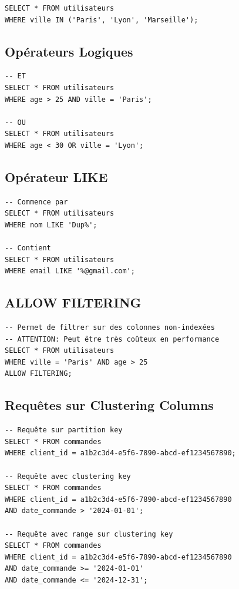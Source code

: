 \documentclass[11pt,a4paper]{article}
\begin{document}
\begin{lstlisting}
SELECT * FROM utilisateurs
WHERE ville IN ('Paris', 'Lyon', 'Marseille');
\end{lstlisting}

\subsection{Opérateurs Logiques}

\begin{lstlisting}
-- ET
SELECT * FROM utilisateurs
WHERE age > 25 AND ville = 'Paris';

-- OU
SELECT * FROM utilisateurs
WHERE age < 30 OR ville = 'Lyon';
\end{lstlisting}

\subsection{Opérateur LIKE}

\begin{lstlisting}
-- Commence par
SELECT * FROM utilisateurs
WHERE nom LIKE 'Dup%';

-- Contient
SELECT * FROM utilisateurs
WHERE email LIKE '%@gmail.com';
\end{lstlisting}

\subsection{ALLOW FILTERING}

\begin{lstlisting}
-- Permet de filtrer sur des colonnes non-indexées
-- ATTENTION: Peut être très coûteux en performance
SELECT * FROM utilisateurs
WHERE ville = 'Paris' AND age > 25
ALLOW FILTERING;
\end{lstlisting}

\subsection{Requêtes sur Clustering Columns}

\begin{lstlisting}
-- Requête sur partition key
SELECT * FROM commandes
WHERE client_id = a1b2c3d4-e5f6-7890-abcd-ef1234567890;

-- Requête avec clustering key
SELECT * FROM commandes
WHERE client_id = a1b2c3d4-e5f6-7890-abcd-ef1234567890
AND date_commande > '2024-01-01';

-- Requête avec range sur clustering key
SELECT * FROM commandes
WHERE client_id = a1b2c3d4-e5f6-7890-abcd-ef1234567890
AND date_commande >= '2024-01-01'
AND date_commande <= '2024-12-31';
\end{lstlisting}
\end{document}
